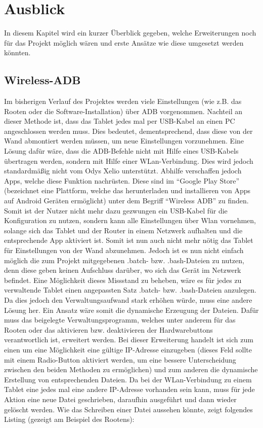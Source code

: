 \chapter{ Ausblick }\label{chap:Ausblick}
\vspace*{-3cm}
\begin{flushleft}
In diesem Kapitel wird ein kurzer Überblick gegeben, welche Erweiterungen noch für das Projekt möglich wären und erste Ansätze wie diese umgesetzt werden könnten. 

\section{Wireless-ADB}
Im bisherigen Verlauf des Projektes werden viele Einstellungen (wie z.B. das Rooten oder die Software-Installation) über ADB vorgenommen. Nachteil an dieser Methode ist, dass das Tablet jedes mal per USB-Kabel an einen PC angeschlossen werden muss. Dies bedeutet, dementsprechend, dass diese von der Wand abmontiert werden müssen, um neue Einstellungen vorzunehmen. Eine Lösung dafür wäre, dass die ADB-Befehle nicht mit Hilfe eines USB-Kabels übertragen werden, sondern mit Hilfe einer WLan-Verbindung. Dies wird jedoch standardmäßig nicht vom Odys Xelio unterstützt. Abhilfe verschaffen jedoch Apps, welche diese Funktion nachrüsten. Diese sind im ``Google Play Store'' (bezeichnet eine Plattform, welche das herunterladen und installieren von Apps auf Android Geräten ermöglicht) unter dem Begriff ``Wireless ADB'' zu finden. Somit ist der Nutzer nicht mehr dazu gezwungen ein USB-Kabel für die Konfiguration zu nutzen, sondern kann alle Einstellungen über Wlan vornehmen, solange sich das Tablet und der Router in einem Netzwerk aufhalten und die entsprechende App aktiviert ist. Somit ist nun auch nicht mehr nötig das Tablet für Einstellungen von der Wand abzunehmen. 
Jedoch ist es nun nicht einfach möglich die zum Projekt mitgegebenen .batch- bzw. .bash-Dateien zu nutzen, denn diese geben keinen Aufschluss darüber, wo sich das Gerät im Netzwerk befindet. Eine Möglichkeit dieses Missstand zu beheben, wäre es für jedes zu verwaltende Tablet einen angepassten Satz .batch- bzw. .bash-Dateien anzulegen. Da dies jedoch den Verwaltungsaufwand stark erhöhen würde, muss eine andere Lösung her. Ein Ansatz wäre somit die dynamische Erzeugung der Dateien. Dafür muss das beigelegte Verwaltungsprogramm, welches unter anderem für das Rooten oder das aktivieren bzw. deaktivieren der Hardwarebuttons verantwortlich ist, erweitert werden. Bei dieser Erweiterung handelt ist sich zum einen um eine Möglichkeit eine gültige IP-Adresse einzugeben (dieses Feld sollte mit einem Radio-Button aktiviert werden, um eine bessere Unterscheidung zwischen den beiden Methoden zu ermöglichen) und zum anderen die dynamische Erstellung von entsprechenden Dateien. Da bei der WLan-Verbindung zu einem Tablet eine jedes mal eine andere IP-Adresse vorhanden sein kann, muss für jede Aktion eine neue Datei geschrieben, daraufhin ausgeführt und dann wieder gelöscht werden. Wie das Schreiben einer Datei aussehen könnte, zeigt folgendes Listing (gezeigt am Beispiel des Rootens):

\end{flushleft}
